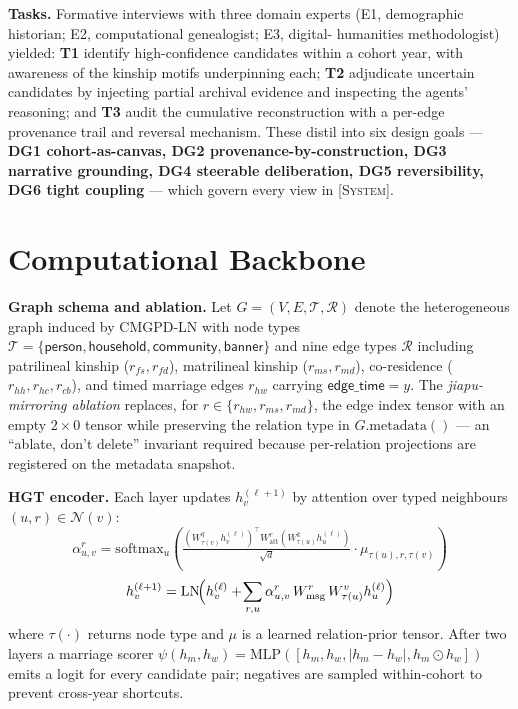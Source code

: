 \documentclass[review]{vgtc}                  %
\newcommand{\system}{\textsc{[System]}\xspace}
\begin{document}
\textbf{Tasks.} Formative interviews with three domain experts (E1,
demographic historian; E2, computational genealogist; E3, digital-
humanities methodologist) yielded:
\textbf{T1} identify high-confidence candidates within a cohort year,
with awareness of the kinship motifs underpinning each;
\textbf{T2} adjudicate uncertain candidates by injecting partial
archival evidence and inspecting the agents' reasoning; and
\textbf{T3} audit the cumulative reconstruction with a per-edge
provenance trail and reversal mechanism.
These distil into six design goals --- \textbf{DG1 cohort-as-canvas,
DG2 provenance-by-construction, DG3 narrative grounding, DG4
steerable deliberation, DG5 reversibility, DG6 tight coupling} ---
which govern every view in \system.

\section{Computational Backbone}
\label{sec:backbone}

\textbf{Graph schema and ablation.} Let
$G = (V, E, \mathcal{T}, \mathcal{R})$ denote the heterogeneous
graph induced by CMGPD-LN with node types
$\mathcal{T} = \{\textsf{person}, \textsf{household},
\textsf{community}, \textsf{banner}\}$ and nine edge types
$\mathcal{R}$ including patrilineal kinship ($r_{fs}, r_{fd}$),
matrilineal kinship ($r_{ms}, r_{md}$), co-residence
($r_{hh}, r_{hc}, r_{cb}$), and timed marriage edges $r_{hw}$
carrying $\textsf{edge\_time} = y$. The \emph{jiapu-mirroring
ablation} replaces, for $r \in \{r_{hw}, r_{ms}, r_{md}\}$, the edge
index tensor with an empty $2 \times 0$ tensor while preserving the
relation type in $G.\mathrm{metadata}()$ --- an ``ablate, don't delete''
invariant required because per-relation projections are registered on
the metadata snapshot.

\textbf{HGT encoder.} Each layer
updates $h_v^{(\ell+1)}$ by attention over typed neighbours
$(u, r) \in \mathcal{N}(v)$:
\begin{equation}
\alpha_{u,v}^{r} = \mathrm{softmax}_u\!\left(
  \tfrac{(W^{q}_{\tau(v)} h_v^{(\ell)})^{\!\top}
         W^{r}_{\mathrm{att}}
         (W^{k}_{\tau(u)} h_u^{(\ell)})}{\sqrt{d}}
  \cdot \mu_{\tau(u),r,\tau(v)}\right)
\end{equation}
\begin{equation}
h_v^{(\ell+1)} = \mathrm{LN}\!\Bigl(
  h_v^{(\ell)} + \!\sum_{r,u} \alpha_{u,v}^{r}\,
    W^{r}_{\mathrm{msg}}\,W^{v}_{\tau(u)} h_u^{(\ell)}\Bigr)
\end{equation}
where $\tau(\cdot)$ returns node type and $\mu$ is a learned
relation-prior tensor. After two layers a marriage scorer
$\psi(h_m, h_w) = \mathrm{MLP}([h_m, h_w, |h_m - h_w|, h_m \odot h_w])$
emits a logit for every candidate pair; negatives are sampled
within-cohort to prevent cross-year shortcuts.
\end{document}
